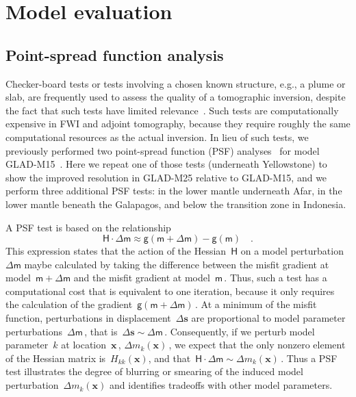 \documentclass[extra,mreferee]{gji}
\begin{document}
\section{Model evaluation}
\label{section:evaluation}


\subsection{Point-spread function analysis}

Checker-board tests or tests involving a chosen known structure, e.g., a plume or slab,
are frequently used to assess the quality of a tomographic inversion,
despite the fact that such tests have limited relevance~\citep[e.g.,][]{Leveque1993}.
Such tests are computationally expensive in FWI and adjoint tomography, because they
require roughly the same computational resources as the actual inversion.
In lieu of such tests, we previously performed two point-spread function (PSF) analyses~\citep{fichtner2011resolution}
for model GLAD-M15~\citep{bozdaug2016global}.
Here we repeat one of those tests (underneath Yellowstone) to show the improved resolution in GLAD-M25 relative to GLAD-M15,
and we perform three additional PSF tests: in the lower mantle underneath Afar, in the lower mantle beneath the Galapagos, and below the transition zone in Indonesia. 

A PSF test is based on the relationship
\begin{equation}
    \mathsf{H}\cdot\mathsf{\Delta}\mathsf{m}\approx\mathsf{g}(\mathsf{m}+\mathsf{\Delta}\mathsf{m})-\mathsf{g}(\mathsf{m})
    \quad .
\end{equation}
This expression states that the action of the Hessian~$\mathsf{H}$ on a model perturbation~$\mathsf{\Delta}\mathsf{m}$ maybe calculated by taking the difference between the misfit gradient at model~$\mathsf{m}+\mathsf{\Delta}\mathsf{m}$ and the misfit gradient at model~$\mathsf{m}$\,.
Thus, such a test has a computational cost that is equivalent to one iteration, because it only requires the calculation of the gradient~$\mathsf{g}(\mathsf{m}+\mathsf{\Delta}\mathsf{m})$\,.
At a minimum of the misfit function,
perturbations in displacement~$\Delta\mathbf{s}$ are proportional to model parameter perturbations~$\mathsf{\Delta}\mathsf{m}$\,, that is~$\Delta\mathbf{s}\sim\mathsf{\Delta}\mathsf{m}$\,.
Consequently, if we perturb model parameter~$k$ at location~$\mathbf{x}$\,,
$\Delta m_k(\mathbf{x})$\,,
we expect that the only nonzero element of the Hessian matrix is~$H_{kk}(\mathbf{x})$, and that~$\mathsf{H}\cdot\mathsf{\Delta}\mathsf{m}\sim\Delta m_k(\mathbf{x})$\,.
Thus a PSF test illustrates the degree of blurring or smearing of the induced model perturbation~$\Delta m_k(\mathbf{x})$ and identifies tradeoffs with other model parameters.
\end{document}
